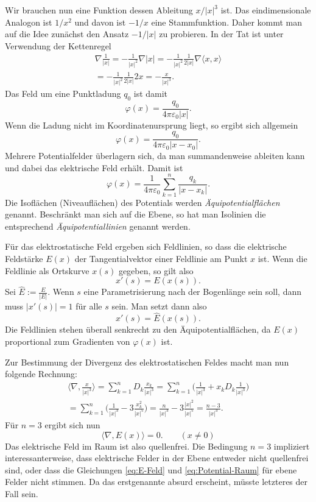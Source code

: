 \documentclass[a4paper,10pt,fleqn,twocolumn,twoside]{article}
\begin{document}
Wir brauchen nun eine Funktion dessen Ableitung
$x/|x|^3$ ist. Das eindimensionale Analogon
ist $1/x^2$ und davon ist $-1/x$ eine Stammfunktion.
Daher kommt man auf die Idee zunächst den Ansatz
$-1/|x|$ zu probieren. In der Tat ist
unter Verwendung der Kettenregel
\begin{gather*}
\nabla\frac{1}{|x|} = -\frac{1}{|x|^2}\nabla |x|
= -\frac{1}{|x|^2}\frac{1}{2|x|}\nabla\langle x,x\rangle\\
= -\frac{1}{|x|^2}\frac{1}{2|x|}2x
= -\frac{x}{|x|^3}.
\end{gather*}
Das Feld um eine Punktladung $q_0$ ist damit
\begin{equation}\label{eq:Potential-Raum}
\varphi(x) = \frac{q_0}{4\pi\varepsilon_0|x|}.
\end{equation}
Wenn die Ladung nicht im Koordinatenursprung liegt, so ergibt
sich allgemein
\[\varphi(x) = \frac{q_0}{4\pi\varepsilon_0|x-x_0|}.\]
Mehrere Potentialfelder überlagern sich, da man summandenweise
ableiten kann und dabei das elektrische Feld erhält.
Damit ist
\[\varphi(x) = \frac{1}{4\pi\varepsilon_0}
\sum_{k=1}^n \frac{q_k}{|x-x_k|}.\]
Die Isoflächen (Niveauflächen)
des Potentials werden \emph{Äquipotentialflächen} genannt.
Beschränkt man sich auf die Ebene, so hat man Isolinien die
entsprechend \emph{Äquipotentiallinien} genannt werden.

Für das elektrostatische Feld ergeben sich Feldlinien, so dass
die elektrische Feldstärke $E(x)$ der Tangentialvektor
einer Feldlinie am Punkt $x$ ist. Wenn die Feldlinie als
Ortskurve $x(s)$ gegeben, so gilt also
\[x'(s)=E(x(s)).\]
Sei $\hat E:=\frac{E}{|E|}$. Wenn $s$ eine Parametrisierung nach
der Bogenlänge sein soll, dann muss $|x'(s)|=1$ für alle $s$ sein.
Man setzt dann also
\[x'(s)=\hat E(x(s)).\]
Die Feldlinien stehen überall senkrecht zu den Äquipotentialflächen,
da $E(x)$ proportional zum Gradienten von $\varphi(x)$ ist.

Zur Bestimmung der Divergenz des elektrostatischen Feldes macht man
nun folgende Rechnung:
\begin{gather*}
\langle\nabla,\frac{x}{|x|^3}\rangle
= \sum_{k=1}^n D_k\frac{x_k}{|x|^3}
= \sum_{k=1}^n \bigg(\frac{1}{|x|^3}+x_kD_k\frac{1}{|x|^3}\bigg)\\
= \sum_{k=1}^n \bigg(\frac{1}{|x|^3}-3\frac{x_k^2}{|x|^5}\bigg)
= \frac{n}{|x|^3}-3\frac{|x|^2}{|x|^5}
= \frac{n-3}{|x|^3}.
\end{gather*}
Für $n=3$ ergibt sich nun
\begin{equation}\label{eq:quellenfrei}
\langle\nabla,E(x)\rangle = 0.\qquad (x\ne 0)
\end{equation}
Das elektrische Feld im Raum ist also quellenfrei.
Die Bedingung $n=3$ impliziert interessanterweise, dass elektrische
Felder in der Ebene entweder nicht quellenfrei sind, oder dass
die Gleichungen \eqref{eq:E-Feld} und \eqref{eq:Potential-Raum} für
ebene Felder nicht stimmen. Da das erstgenannte absurd erscheint,
müsste letzteres der Fall sein.
\end{document}
